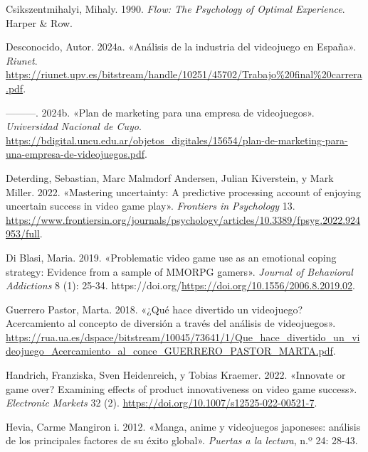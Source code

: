 \documentclass[
  letterpaper,
  DIV=11,
  numbers=noendperiod]{scrreprt}
\newlength{\cslhangindent}
\newlength{\cslentryspacingunit} %
\newenvironment{CSLReferences}[2] %
 {%
  \setlength{\parindent}{0pt}
  \ifodd #1
  \let\oldpar\par
  \def\par{\hangindent=\cslhangindent\oldpar}
  \fi
  \setlength{\parskip}{#2\cslentryspacingunit}
 }%
 {}
\begin{document}
\hypertarget{refs}{}
\begin{CSLReferences}{1}{0}
\leavevmode{}%
Csikszentmihalyi, Mihaly. 1990. \emph{Flow: The Psychology of Optimal
Experience}. Harper \& Row.

\leavevmode{}%
Desconocido, Autor. 2024a. {«Análisis de la industria del videojuego en
España»}. \emph{Riunet}.
\url{https://riunet.upv.es/bitstream/handle/10251/45702/Trabajo\%20final\%20carrera.pdf}.

\leavevmode{}%
---------. 2024b. {«Plan de marketing para una empresa de videojuegos»}.
\emph{Universidad Nacional de Cuyo}.
\url{https://bdigital.uncu.edu.ar/objetos_digitales/15654/plan-de-marketing-para-una-empresa-de-videojuegos.pdf}.

\leavevmode{}%
Deterding, Sebastian, Marc Malmdorf Andersen, Julian Kiverstein, y Mark
Miller. 2022. {«Mastering uncertainty: A predictive processing account
of enjoying uncertain success in video game play»}. \emph{Frontiers in
Psychology} 13.
\url{https://www.frontiersin.org/journals/psychology/articles/10.3389/fpsyg.2022.924953/full}.

\leavevmode{}%
Di Blasi, Maria. 2019. {«Problematic video game use as an emotional
coping strategy: Evidence from a sample of MMORPG gamers»}.
\emph{Journal of Behavioral Addictions} 8 (1): 25-34.
https://doi.org/\url{https://doi.org/10.1556/2006.8.2019.02}.

\leavevmode{}%
Guerrero Pastor, Marta. 2018. {«¿Qué hace divertido un videojuego?
Acercamiento al concepto de diversión a través del análisis de
videojuegos»}.
\url{https://rua.ua.es/dspace/bitstream/10045/73641/1/Que_hace_divertido_un_videojuego_Acercamiento_al_conce_GUERRERO_PASTOR_MARTA.pdf}.

\leavevmode{}%
Handrich, Franziska, Sven Heidenreich, y Tobias Kraemer. 2022.
{«Innovate or game over? Examining effects of product innovativeness on
video game success»}. \emph{Electronic Markets} 32 (2).
\url{https://doi.org/10.1007/s12525-022-00521-7}.

\leavevmode{}%
Hevia, Carme Mangiron i. 2012. {«Manga, anime y videojuegos japoneses:
análisis de los principales factores de su éxito global»}. \emph{Puertas
a la lectura}, n.º 24: 28-43.


\end{CSLReferences}
\end{document}
